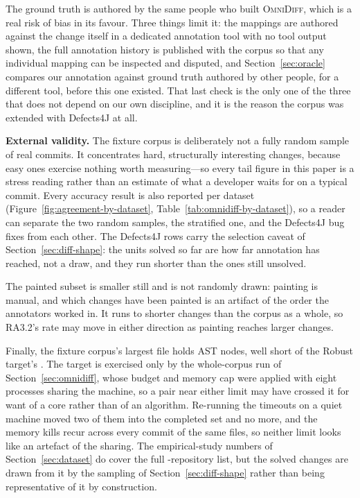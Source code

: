 \documentclass[sigconf]{acmart}
\begin{document}
The ground truth is authored by the same people who built \textsc{OmniDiff}, which is a real risk
of bias in its favour. Three things limit it: the mappings are authored against the change itself in
a dedicated annotation tool with no tool output shown, the full annotation history is published
with the corpus so that any individual mapping can be inspected and disputed, and
Section~\ref{sec:oracle} compares our annotation against ground truth authored by other people,
for a different tool, before this one existed. That last check is the only one of the three that does not
depend on our own discipline, and it is the reason the corpus was extended with Defects4J at all.

\textbf{External validity.} The fixture corpus is deliberately not a fully random sample of
real commits. It concentrates hard, structurally interesting changes, because easy ones exercise
nothing worth measuring---so every tail figure in this paper is a stress reading rather than an
estimate of what a developer waits for on a typical commit. Every accuracy result is also reported per dataset (Figure~\ref{fig:agreement-by-dataset},
Table~\ref{tab:omnidiff-by-dataset}), so a reader can separate the two random samples, the
stratified one, and the Defects4J bug fixes from each other. The Defects4J rows carry the
selection caveat of Section~\ref{sec:diff-shape}: the units solved so far are how far annotation
has reached, not a draw, and they run shorter than the ones still unsolved.

The painted subset is smaller still and is not randomly drawn: painting is manual, and which
changes have been painted is an artifact of the order the annotators worked in. It runs to
shorter changes than the corpus as a whole, so RA3.2's rate may move in either direction as
painting reaches larger changes.

Finally, the fixture corpus's largest file holds \RobustnessMaxNodes{} AST nodes, well short of
the Robust target's \AstMax{}. The target is exercised only by the whole-corpus run of
Section~\ref{sec:omnidiff}, whose budget and memory cap were applied with eight processes
sharing the machine, so a pair near either limit may have crossed it for want of a core rather
than of an algorithm. Re-running the timeouts on a quiet machine moved two of them into the
completed set and no more, and the memory kills recur across every commit of the same files,
so neither limit looks like an artefact of the sharing. The empirical-study
numbers of Section~\ref{sec:dataset} do cover the full \NumRepos{}-repository list, but the
\NumFixtures{} solved changes are drawn from it by the sampling of
Section~\ref{sec:diff-shape} rather than being representative of it by construction.
\end{document}
